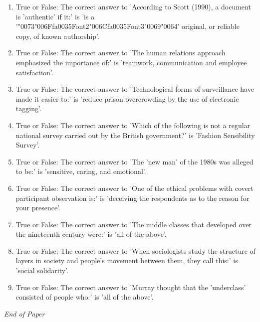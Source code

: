 \documentclass[12pt]{article}
\begin{document}
\begin{enumerate}[label=\arabic*.]
\item True or False: The correct answer to 'According to Scott (1990), a document is 'authentic' if it:' is 'is a '{\char"0073}{\char"006F}{\csname fa0035Font2\endcsname\char"006C}{\csname fa0035Font3\endcsname\char"0069}{\char"0064}' original, or reliable copy, of known authorship'.
\item True or False: The correct answer to 'The human relations approach emphasized the importance of:' is 'teamwork, communication and employee satisfaction'.
\item True or False: The correct answer to 'Technological forms of surveillance have made it easier to:' is 'reduce prison overcrowding by the use of electronic tagging'.
\item True or False: The correct answer to 'Which of the following is not a regular national survey carried out by the British government?' is 'Fashion Sensibility Survey'.
\item True or False: The correct answer to 'The 'new man' of the 1980s was alleged to be:' is 'sensitive, caring, and emotional'.
\item True or False: The correct answer to 'One of the ethical problems with covert participant observation is:' is 'deceiving the respondents as to the reason for your presence'.
\item True or False: The correct answer to 'The middle classes that developed over the nineteenth century were:' is 'all of the above'.
\item True or False: The correct answer to 'When sociologists study the structure of layers in society and people's movement between them, they call this:' is 'social solidarity'.
\item True or False: The correct answer to 'Murray thought that the 'underclass' consisted of people who:' is 'all of the above'.
\end{enumerate}

\vfill
\noindent\textit{End of Paper}
\end{document}
